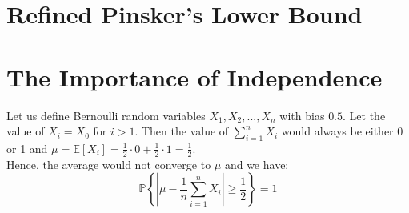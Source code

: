 \documentclass[a4paper]{article}
\begin{document}
\section{Refined Pinsker’s Lower Bound}


\section{The Importance of Independence}
Let us define Bernoulli random variables $X_1, X_2, ..., X_n$ with bias $0.5$.
Let the value of $X_i = X_0$ for $i>1$. Then the value of
$\sum_{i=1}^{n} X_{i}$ would always be either 0 or 1 and
$\mu = \mathbb{E}\left[X_{i}\right] = \frac{1}{2} \cdot 0 + \frac{1}{2} \cdot 1 = \frac{1}{2}$.\\
Hence, the average would not converge to $\mu$ and we have:
$$
\mathbb{P}\left\{\left|\mu-\frac{1}{n} \sum_{i=1}^{n} X_{i}\right| \geq \frac{1}{2}\right\}=1
$$
\end{document}
